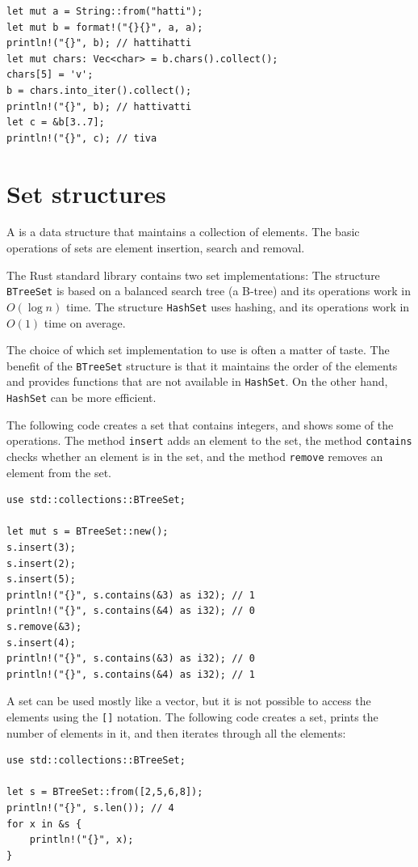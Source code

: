 \begin{lstlisting}
let mut a = String::from("hatti");
let mut b = format!("{}{}", a, a);
println!("{}", b); // hattihatti
let mut chars: Vec<char> = b.chars().collect();
chars[5] = 'v';
b = chars.into_iter().collect();
println!("{}", b); // hattivatti
let c = &b[3..7];
println!("{}", c); // tiva
\end{lstlisting}

\section{Set structures}


A  is a data structure that
maintains a collection of elements.
The basic operations of sets are element
insertion, search and removal.

The Rust standard library contains two set
implementations:
The structure \texttt{BTreeSet} is based on a balanced
search tree (a B-tree) and its operations work in $O(\log n)$ time.
The structure \texttt{HashSet} uses hashing,
and its operations work in $O(1)$ time on average.

The choice of which set implementation to use
is often a matter of taste.
The benefit of the \texttt{BTreeSet} structure
is that it maintains the order of the elements
and provides functions that are not available
in \texttt{HashSet}.
On the other hand, \texttt{HashSet}
can be more efficient.

The following code creates a set
that contains integers,
and shows some of the operations.
The method \texttt{insert} adds an element to the set,
the method \texttt{contains} checks whether
an element is in the set,
and the method \texttt{remove} removes an element from the set.

\begin{lstlisting}
use std::collections::BTreeSet;

let mut s = BTreeSet::new();
s.insert(3);
s.insert(2);
s.insert(5);
println!("{}", s.contains(&3) as i32); // 1
println!("{}", s.contains(&4) as i32); // 0
s.remove(&3);
s.insert(4);
println!("{}", s.contains(&3) as i32); // 0
println!("{}", s.contains(&4) as i32); // 1
\end{lstlisting}

A set can be used mostly like a vector,
but it is not possible to access
the elements using the \texttt{[]} notation.
The following code creates a set,
prints the number of elements in it, and then
iterates through all the elements:
\begin{lstlisting}
use std::collections::BTreeSet;

let s = BTreeSet::from([2,5,6,8]);
println!("{}", s.len()); // 4
for x in &s {
    println!("{}", x);
}
\end{lstlisting}

